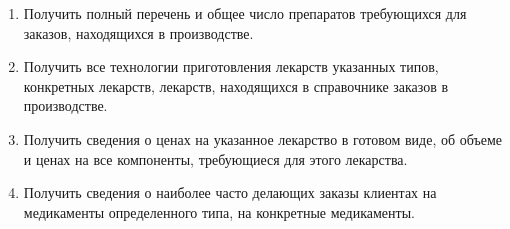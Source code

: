 \documentclass[a4paper]{article}
\begin{document}
\begin{enumerate}
				
			
			\item Получить полный перечень и общее число препаратов требующихся для заказов, находящихся в производстве.
			
				
				
				
			
			\item Получить все технологии приготовления лекарств указанных типов, конкретных лекарств, лекарств, находящихся в справочнике заказов в производстве.
			
				
				
				
				
				
			
			\item Получить сведения о ценах на указанное лекарство в готовом виде, об объеме и ценах на все компоненты, требующиеся для этого лекарства.
			
				
			
			\item Получить сведения о наиболее часто делающих заказы клиентах на медикаменты определенного типа, на конкретные медикаменты.
			
				
				

\end{enumerate}
\end{document}
